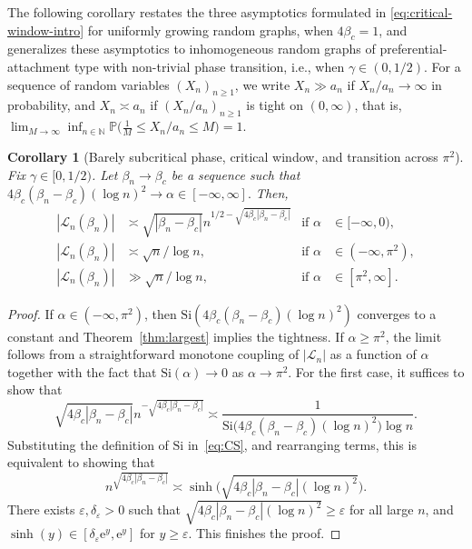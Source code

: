 \documentclass[a4paper, a4wide, 10pt, reqno]{amsart}
\theoremstyle{plain}
\newtheorem{corollary}[theorem]{Corollary}
\theoremstyle{definition}
\numberwithin{equation}{section}
\newcommand{\N}{{\mathbb N}}
\newcommand{\Prob}{\mathbb{P}}
\newcommand{\sL}{{\mathscr L}}
\newcommand{\re}{{\mathrm e}}
\newcommand{\Si}{{\mathrm{Si}}}
\begin{document}
The following corollary restates the three asymptotics formulated in \eqref{eq:critical-window-intro} for uniformly growing random graphs, when $4\beta_c=1$, and generalizes these asymptotics to inhomogeneous random graphs of preferential-attachment type with non-trivial phase transition, i.e., when $\gamma\in(0, 1/2)$.
For a sequence of random variables $(X_n)_{n\ge1}$, we write $X_n\gg a_n$ if $X_n/a_n\to\infty$ in probability, and $X_n\asymp a_n$ if $(X_n/a_n)_{n\ge 1}$ is tight on $(0,\infty)$, that is, $\lim_{M\to\infty}\inf_{n\in \N}\Prob\big(\tfrac{1}M\le X_n/a_n\le M\big)=1.$
\begin{corollary}[Barely subcritical phase, critical window, and transition across $\pi^2$]\label{cor:critical}
    Fix $\gamma\in[0, 1/2)$. 
     Let  $\beta_n\to\beta_c$ be a sequence such that $4\beta_c(\beta_{n}-\beta_c)(\log n)^2\to\alpha\in[-\infty, \infty].$ Then, 
     \begin{align}
    |\sL_n(\beta_n)|&\asymp \sqrt{|\beta_n-\beta_c|}n^{1/2-\sqrt{4\beta_c|\beta_n-\beta_c|}} &\text{if }\alpha&\in[-\infty, 0), \nonumber\\
    |\sL_n(\beta_n)|&\asymp \sqrt{n}/\log n,&\text{if }\alpha&\in(-\infty,\pi^2),\nonumber\\
    |\sL_n(\beta_n)|&\gg \sqrt{n}/\log n,&\text{if }\alpha&\in[\pi^2,\infty].\nonumber
\end{align}
\end{corollary}


\begin{proof}
     If $\alpha\in(-\infty,\pi^2)$,  then 
     $\Si(4\beta_c(\beta_{n}-\beta_c)(\log n)^2)$ converges to a constant and Theorem~\ref{thm:largest} implies the tightness. 
    If $\alpha\ge\pi^2$, the limit follows from a straightforward monotone coupling of $|\mathscr L_n|$
    as a function of $\alpha$ together with the fact that $\Si(\alpha)\to0$ as $\alpha\to\pi^2$. For the first case,  it suffices to show that 
        \[
        \sqrt{4\beta_c|\beta_n-\beta_c|}n^{-\sqrt{4\beta_c|\beta_n-\beta_c|}}\asymp \frac{1}{\Si\big(4\beta_c(\beta_n-\beta_c)(\log n)^2\big)\log n}.
        \]
        Substituting the definition of $\Si$ in~\eqref{eq:CS}, and rearranging terms, this is equivalent to showing that 
        \[
        n^{\sqrt{4\beta_c|\beta_n-\beta_c|}}\asymp \sinh\big(\sqrt{4\beta_c|\beta_n-\beta_c|(\log n)^2}\big).
        \]
        There exists $\varepsilon,\delta_\varepsilon>0$ such that $\sqrt{4\beta_c|\beta_n-\beta_c|(\log n)^2}\ge\varepsilon$ for all large $n$, and 
        $\sinh(y)\in[ \delta_\varepsilon\re^y, \re^y]$ for $y\ge \varepsilon$. This finishes the proof.
\end{proof}
\end{document}
